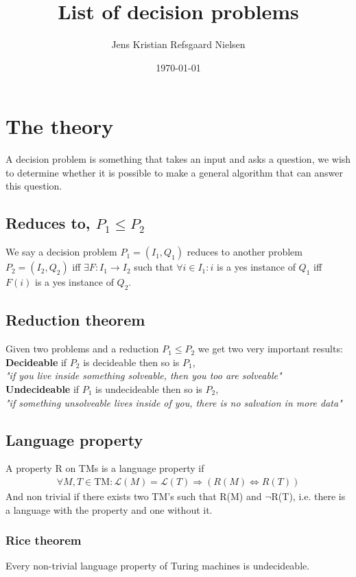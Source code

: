 \documentclass{article}
\theoremstyle{remark}
\numberwithin{equation}{section}
\begin{document}
	\author{Jens Kristian Refsgaard Nielsen}
	\title{List of decision problems}
	\date{\today}
	\maketitle
\section{The theory}
A decision problem is something that takes an input and asks a question, we wish to determine whether it is possible to make a general algorithm that can answer this question.\\
\subsection{Reduces to, $P_1\leq P_2$}
We say a decision problem $P_1=(I_1,Q_1)$ reduces to another problem $P_2=(I_2,Q_2)$ iff $\exists F:I_1\rightarrow I_2$ such that $\forall i \in I_1 : i $ is a yes instance of $Q_1$ iff $F(i)$ is a yes instance of $Q_2$.
\subsection{Reduction theorem}
Given two problems and a reduction $P_1\leq P_2$ we get two very important results:\\
\textbf{Decideable} if $P_2$ is decideable then so is $P_1$,
\\\indent\textit{"if you live inside something solveable, then you too are solveable"}\\
\textbf{Undecideable} if $P_1$ is undecideable then so is $P_2$,
\\\indent\textit{"if something unsolveable lives inside of you, there is no salvation in more data"}\\
\subsection{Language property}
A property R on TMs is a language property if
\begin{align*}
	\forall M,T\in\text{TM}: \mathcal{L}(M)=\mathcal{L}(T)\Rightarrow(R(M)\iff R(T))
\end{align*}
And non trivial if there exists two TM's such that R(M) and $\neg$R(T), i.e. there is a language with the property and one without it.
\subsubsection{Rice theorem}
Every non-trivial language property of Turing machines is undecideable.
\end{document}

